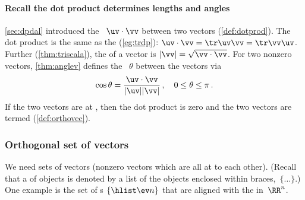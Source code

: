 \paragraph{Recall the dot product determines lengths and angles}
\cref{sec:dpdal} introduced the ~\(\uv\cdot\vv\) between two vectors (\cref{def:dotprod}).
The dot product is the same as the  (\cref{eg:trdp}): \(\uv\cdot\vv=\tr\uv\vv=\tr\vv\uv\).
Further (\cref{thm:triscala}), the  of a vector is \(|\vv|=\sqrt{\vv\cdot\vv}\).
For two nonzero vectors, \cref{thm:anglev} defines the ~\(\theta\) between the vectors via 
\begin{equation*}
\cos\theta=\frac{\uv\cdot\vv}{|\uv||\vv|}\,,
\quad 0\leq\theta\leq\pi\,.
\end{equation*}
If the two vectors are at , then the dot product is zero and the two vectors are termed  (\cref{def:orthovec}).









\subsubsection{Orthogonal set of vectors}


We need sets of  vectors (nonzero vectors which are all at  to each other).
(Recall that a  of objects is denoted by a list of the objects enclosed within braces,~\(\{\ldots\}\).)
One example is the set of s \(\{\hlist\ev n\}\) that are aligned with the  in~\(\RR^n\).  

